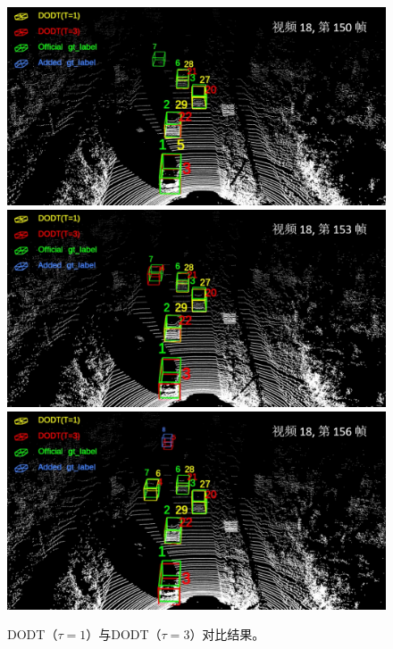 \begin{figure}[t]
	\centering
	\includegraphics[width=\textwidth]{./imgs/viz_results/val/dodt_1_3_01.png}\vspace{1pt}
	\includegraphics[width=\textwidth]{./imgs/viz_results/val/dodt_1_3_02.png}\vspace{1pt}
	\includegraphics[width=\textwidth]{./imgs/viz_results/val/dodt_1_3_03.png}
	\caption{DODT（$\tau=1$）与DODT（$\tau=3$）对比结果。}
	\label{fig:dodt_1_3}
\end{figure}

